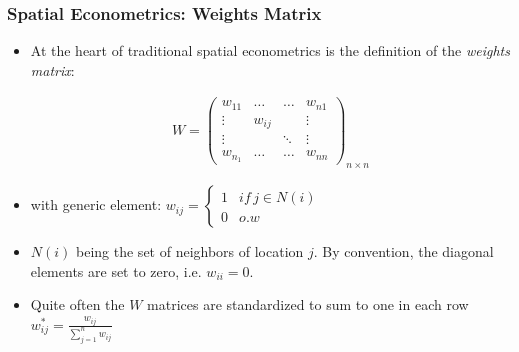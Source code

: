 \documentclass[
  shownotes,
  xcolor={svgnames},
  hyperref={colorlinks,citecolor=DarkBlue,linkcolor=DarkRed,urlcolor=DarkBlue}
  , aspectratio=169]{beamer}
\begin{document}
\begin{frame}[fragile]
\frametitle{Spatial Econometrics: Weights Matrix}

\begin{itemize}
  \item At the heart of traditional spatial econometrics is the definition of the {\it weights matrix}:



\begin{align}
W=\left(\begin{array}{cccc}
w_{11} & \dots & \dots & w_{n1}\\
\vdots & w_{ij} &  & \vdots\\
\vdots &  & \ddots & \vdots\\
w_{n_{1}} & \dots & \dots & w_{nn}
\end{array}\right)_{n\times n}
\end{align}

\item with generic element: $w_{ij}=\begin{cases}
1 & if\,j\in N\left(i\right)\\
0 & o.w
\end{cases}$



\item  $N(i)$ being the set of neighbors of location $j$. By convention, the diagonal elements are set to zero, i.e. $w_{ii}=0$. 


\item Quite often the $W$ matrices are standardized to sum to one in each row $w^*_{ij}=\frac{w_{ij}}{\sum_{j=1}^n w_{ij}}$


\end{itemize}

\end{frame}
\end{document}
